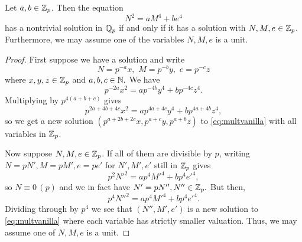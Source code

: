 \documentclass[12pt, a4paper]{amsart}
\begin{document}
\begin{lemma} \label{vanilla}
  Let $a, b \in {\mathbb Z}_p$. Then the equation 
  \begin{equation}
    \label{eq:multvanilla}
    N^2 = aM^4 + be^4
  \end{equation}
  has a nontrivial solution in ${\mathbb Q}_p$ if and only if it has a solution with
  $N, M, e \in {\mathbb Z}_p$. Furthermore, we may assume one of the variables $N, M, e$
  is a unit.
\end{lemma}

\begin{proof}
  First suppose we have a solution and write
  $$N = p^{-a}x, \,\, M = p^{-b}y, \,\, e = p^{-c}z$$ where $x,y,z \in {\mathbb Z}_p$ and
  $a,b,c \in {\mathbb N}.$ We have
  \[p^{-2a}x^2 = ap^{-4b}y^4 + bp^{-4c}z^4.\]
  Multiplying by $p^{4(a+b+c)}$ gives
  \[p^{2a+4b+4c}x^2 = ap^{4a+4c}y^4 + bp^{4a+4b}z^4,\]
  so we get a new solution $(p^{a+2b+2c}x, p^{a+c}y, p^{a+b}z)$ to
  \autoref{eq:multvanilla} with all variables in ${\mathbb Z}_p$.

  Now suppose $N, M, e \in {\mathbb Z}_p$. If all of them are divisible by $p$,
  writing $N = pN', M = pM', e = pe'$ for $N', M', e'$ still in ${\mathbb Z}_p$ gives
  \[p^2N'^2 = ap^4M'^4 + b p^4e'^4, \]
  so $N \equiv 0 \, (p)$ and we in fact have $N' = pN'', N'' \in {\mathbb Z}_p.$ 
  But then,
  \[p^4N''^2 = ap^4M'^4 + bp^4e'^4.\]
  Dividing through by $p^4$ we see that $(N'',M',e')$ is a new solution to
  \autoref{eq:multvanilla} where each variable has
  strictly smaller valuation. Thus, we may assume one of $N,M,e$ is a unit.
\end{proof}
\end{document}
